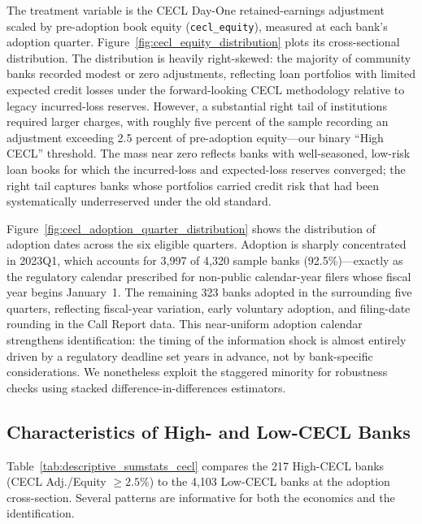 The treatment variable is the CECL Day-One retained-earnings adjustment scaled
by pre-adoption book equity (\texttt{cecl\_equity}), measured at each bank's
adoption quarter. Figure~\ref{fig:cecl_equity_distribution} plots its
cross-sectional distribution. The distribution is heavily right-skewed: the
majority of community banks recorded modest or zero adjustments, reflecting
loan portfolios with limited expected credit losses under the forward-looking
CECL methodology relative to legacy incurred-loss reserves. However, a
substantial right tail of institutions required larger charges, with roughly
five percent of the sample recording an adjustment exceeding 2.5 percent of
pre-adoption equity---our binary ``High CECL'' threshold. The mass near zero
reflects banks with well-seasoned, low-risk loan books for which the incurred-loss
and expected-loss reserves converged; the right tail captures banks whose
portfolios carried credit risk that had been systematically underreserved under
the old standard.

Figure~\ref{fig:cecl_adoption_quarter_distribution} shows the distribution of
adoption dates across the six eligible quarters. Adoption is sharply concentrated
in 2023Q1, which accounts for 3,997 of 4,320 sample banks (92.5\%)---exactly as
the regulatory calendar prescribed for non-public calendar-year filers whose
fiscal year begins January~1. The remaining 323 banks adopted in the surrounding
five quarters, reflecting fiscal-year variation, early voluntary adoption, and
filing-date rounding in the Call Report data. This near-uniform adoption calendar
strengthens identification: the timing of the information shock is almost
entirely driven by a regulatory deadline set years in advance, not by
bank-specific considerations. We nonetheless exploit the staggered minority for
robustness checks using stacked difference-in-differences estimators.

\subsection{Characteristics of High- and Low-CECL Banks}
\label{sec:data:balance}

Table~\ref{tab:descriptive_sumstats_cecl} compares the 217 High-CECL banks
(CECL Adj./Equity $\geq 2.5\%$) to the 4,103 Low-CECL banks at the adoption
cross-section. Several patterns are informative for both the economics and the
identification.


